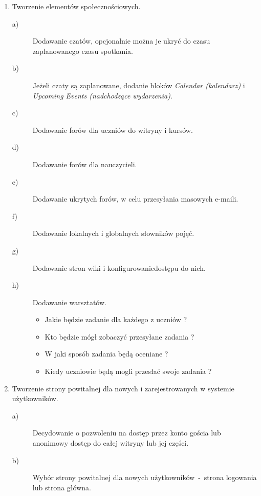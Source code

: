 \begin{enumerate}
	\item Tworzenie elementów społecznościowych.
	\begin{description}
		\item[a)] Dodawanie czatów, opcjonalnie można je ukryć do czasu zaplanowanego czasu spotkania.
		\item[b)] Jeżeli czaty są zaplanowane, dodanie bloków \textit{Calendar (kalendarz)} i \textit{Upcoming Events (nadchodzące wydarzenia)}.
		\item[c)] Dodawanie forów dla uczniów do witryny i kursów.
		\item[d)] Dodawanie forów dla nauczycieli.
		\item[e)] Dodawanie ukrytych forów, w celu przesyłania masowych e-maili.
		\item[f)] Dodawanie lokalnych i globalnych słowników pojęć.
		\item[g)] Dodawanie stron wiki i konfigurowaniedostępu do nich.
		\item[h)] Dodawanie warsztatów.
			\begin{itemize}
				\item Jakie będzie zadanie dla każdego z uczniów ?
				\item Kto będzie mógł zobaczyć przesyłane zadania ?
				\item W jaki sposób zadania będą oceniane ?
				\item Kiedy uczniowie będą mogli przesłać swoje zadania ?
			\end{itemize} 
	\end{description}
	\item Tworzenie strony powitalnej dla nowych i zarejestrowanych w systemie użytkowników.
	\begin{description}
		\item[a)] Decydowanie o pozwoleniu na dostęp przez konto gościa lub anonimowy dostęp do całej witryny lub jej części.
		\item[b)] Wybór strony powitalnej dla nowych użytkowników~-~strona logowania lub strona główna.

\end{description}
\end{enumerate}
